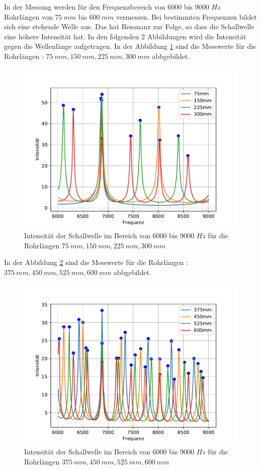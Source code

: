 In der Messung werden für den Frequenzbereich von 6000 bis 9000 $\si{Hz}$ Rohrlängen von $\SI{75}{mm}$ bis $\SI{600}{mm}$ vermessen.
Bei bestimmten Frequenzen bildet sich eine stehende Welle aus. Das hat Resonanz zur Folge, so dass die Schallwelle eine höhere Intensität hat.
In den folgenden 2 Abbildungen wird die Intensität gegen die Wellenlänge aufgetragen.
In der Abbildung \ref{fig.1} sind die Messwerte für die Rohrlängen : $\SI{75}{mm}, \SI{150}{mm}, \SI{225}{mm}, \SI{300}{mm}$ abbgebildet.
\begin{figure}[h!]
  \centering
  \includegraphics[width=\textwidth]{1234.pdf}
  \caption{Intensität der Schallwelle im Bereich von 6000 bis 9000 $\si{Hz}$ für die Rohrlängen $\SI{75}{mm}, \SI{150}{mm}, \SI{225}{mm}, \SI{300}{mm}$}
  \label{fig.1}
\end{figure}
In der Abbildung \ref{fig.2} sind die Messwerte für die Rohrlängen : $\SI{375}{mm}, \SI{450}{mm}, \SI{525}{mm}, \SI{600}{mm}$ abbgebildet.
\begin{figure}[h!]
  \centering
  \includegraphics[width=\textwidth]{5678.pdf}
  \caption{Intensität der Schallwelle im Bereich von 6000 bis 9000 $\si{Hz}$ für die Rohrlängen $\SI{375}{mm}, \SI{450}{mm}, \SI{525}{mm}, \SI{600}{mm}$}
  \label{fig.2}
\end{figure}
